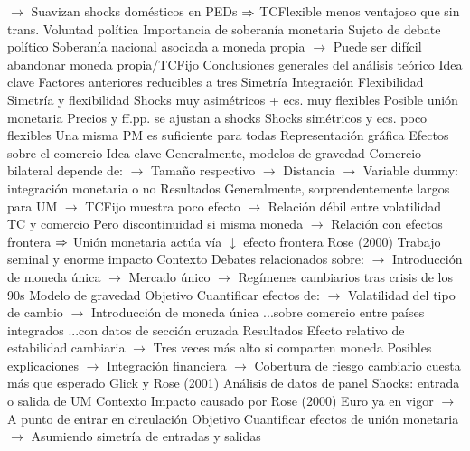 \documentclass{nuevotema}
\begin{document}
\begin{esquemal}
				\4[] $\to$ Suavizan shocks domésticos en PEDs
				\4[] $\Rightarrow$ TCFlexible menos ventajoso que sin trans.
			 Voluntad política
				\4 Importancia de soberanía monetaria
				\4[] Sujeto de debate político
				\4[] Soberanía nacional asociada a moneda propia
				\4[] $\to$ Puede ser difícil abandonar moneda propia/TCFijo
		\2 Conclusiones generales del análisis teórico
			\3 Idea clave
				\4 Factores anteriores reducibles a tres
				\4[I] Simetría
				\4[II] Integración
				\4[III] Flexibilidad
			\3 Simetría y flexibilidad
				\4 Shocks muy asimétricos + ecs. muy flexibles
				\4[] Posible unión monetaria
				\4[] Precios y ff.pp. se ajustan a shocks
				\4 Shocks simétricos y ecs. poco flexibles
				\4[] Una misma PM es suficiente para todas
			\3 Representación gráfica
				\4 
	\1 
		\2 Efectos sobre el comercio
			\3 Idea clave
				\4 Generalmente, modelos de gravedad
				\4[] Comercio bilateral depende de:
				\4[] $\to$ Tamaño respectivo
				\4[] $\to$ Distancia
				\4[] $\to$ Variable dummy: integración monetaria o no
				\4 Resultados
				\4[] Generalmente, sorprendentemente largos para UM
				\4[] $\to$ TCFijo muestra poco efecto
				\4[] $\to$ Relación débil entre volatilidad TC y comercio
				\4[] Pero discontinuidad si misma moneda
				\4[] $\to$ Relación con efectos frontera
				\4[] $\Rightarrow$ Unión monetaria actúa vía $\downarrow$ efecto frontera
			\3 Rose (2000)
				\4 Trabajo seminal y enorme impacto
				\4 Contexto
				\4[] Debates relacionados sobre:
				\4[] $\to$ Introducción de moneda única
				\4[] $\to$ Mercado único
				\4[] $\to$ Regímenes cambiarios tras crisis de los 90s
				\4[] Modelo de gravedad
				\4 Objetivo
				\4[] Cuantificar efectos de:
				\4[] $\to$ Volatilidad del tipo de cambio
				\4[] $\to$ Introducción de moneda única
				\4[] ...sobre comercio entre países integrados
				\4[] ...con datos de sección cruzada
				\4 Resultados
				\4[] Efecto relativo de estabilidad cambiaria
				\4[] $\to$ Tres veces más alto si comparten moneda
				\4[] Posibles explicaciones
				\4[] $\to$ Integración financiera
				\4[] $\to$ Cobertura de riesgo cambiario cuesta más que esperado
			\3 Glick y Rose (2001)
				\4 Análisis de datos de panel
				\4[] Shocks: entrada o salida de UM
				\4 Contexto
				\4[] Impacto causado por Rose (2000)
				\4[] Euro ya en vigor
				\4[] $\to$ A punto de entrar en circulación
				\4 Objetivo
				\4[] Cuantificar efectos de unión monetaria
				\4[] $\to$ Asumiendo simetría de entradas y salidas

\end{esquemal}
\end{document}
